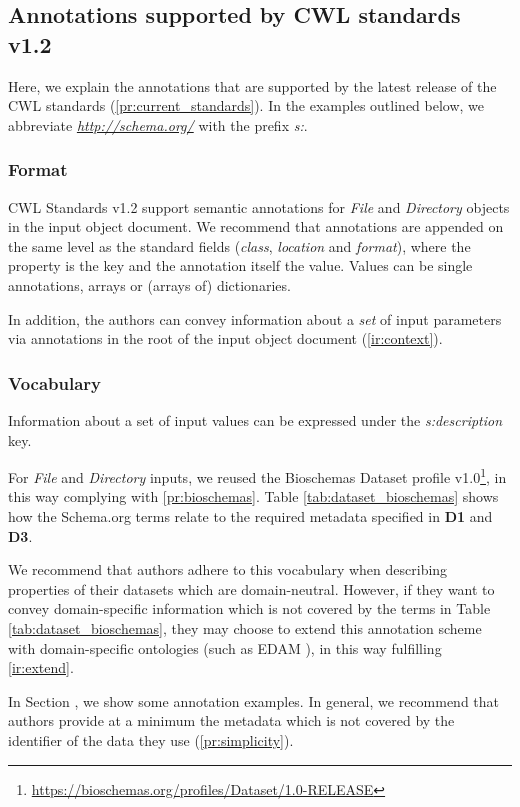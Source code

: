 \subsection{Annotations supported by CWL standards v1.2}
\label{sec:annot_cwl_now}
Here, we explain the annotations that are supported by the latest release of the CWL standards (\ref{pr:current_standards}). In the examples outlined below, we abbreviate \emph{\url{http://schema.org/}} with the prefix \emph{s:}.

\subsubsection{Format}
CWL Standards v1.2 support semantic annotations for \emph{File} and \emph{Directory} objects in the input object document. We recommend that annotations are appended on the same level as the standard fields (\emph{class}, \emph{location} and \emph{format}), where the property is the key and the annotation itself the value. Values can be single annotations, arrays or (arrays of) dictionaries. 

In addition, the authors can convey information about a \emph{set} of input parameters via annotations in the root of the input object document (\ref{ir:context}). 

\subsubsection{Vocabulary}
Information about a set of input values can be expressed under the \emph{s:description} key. 

For \emph{File} and \emph{Directory} inputs, we reused the Bioschemas Dataset profile v1.0\footnote{\url{https://bioschemas.org/profiles/Dataset/1.0-RELEASE}}, in this way complying with \ref{pr:bioschemas}. 
Table \ref{tab:dataset_bioschemas} shows how the Schema.org terms relate to the required metadata specified in \textbf{D1} and  \textbf{D3}. 

We recommend that authors adhere to this vocabulary when describing properties of their datasets which are domain-neutral. However, if they want to convey domain-specific information which is not covered by the terms in Table \ref{tab:dataset_bioschemas}, they may choose to extend this annotation scheme with domain-specific ontologies (such as EDAM \cite{isonEDAMOntologyBioinformatics2013}), in this way fulfilling \ref{ir:extend}. 

In Section \emph{}, we show some annotation examples. In general, we recommend that authors provide at a minimum the metadata which is not covered by the identifier of the data they use (\ref{pr:simplicity}). 

